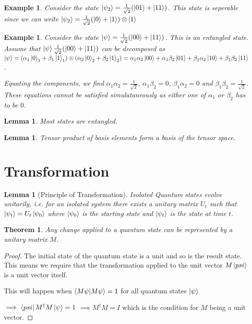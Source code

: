 \documentclass[12pt,twoside]{report}
\theoremstyle{thmstyle}
\newtheorem{thm}[subsection]{Theorem}
\newtheorem{eg}[subsection]{Example}
\newtheorem{lemma}[subsection]{Lemma}
\begin{document}
\begin{eg}
Consider the state $\ket{\psi_2} = \frac{1}{\sqrt{2}} (\ket{01} + \ket{11})$. This state is seperable since we can write $\ket{\psi_2} = \frac{1}{\sqrt{2}} (\ket{0} + \ket{1}) \otimes \ket{1}$
\end{eg}


\begin{eg}
Consider the state $\ket{\psi} = \frac{1}{\sqrt{2}} (\ket{00} + \ket{11})$. This is an entangled state.
    \vspace{0.5cm}
    Assume that  $\ket{\psi} \frac{1}{\sqrt{2}} (\ket{00} + \ket{11}) $ can be decomposed as $\ket{\psi} = (\alpha_1 \ket{0}_1 + \beta_1 \ket{1}_1) \otimes (\alpha_2 \ket{0}_2 + \beta_2 \ket{1}_2) = \alpha_1 \alpha_2 \ket{00} + \alpha_1 \beta_2 \ket{01} + \beta_1 \alpha_2 \ket{10} + \beta_1 \beta_2 \ket{11}$.

    \vspace{0.5cm}

    Equating the components, we find $\alpha_1 \alpha_2 = \frac{1}{\sqrt{2}}$, $\alpha_1 \beta_2 = 0$, $\beta_1 \alpha_2 = 0$ and $\beta_1 \beta_2 = \frac{1}{\sqrt{2}}$. These equations cannot be satisfied simulataneously as either one of $\alpha_1$ or $\beta_2$ has to be $0$.
\end{eg}

\begin{lemma}
    Most states are entangled.
\end{lemma}

\begin{lemma}
    Tensor product of basis elements form a basis of the tensor space.
\end{lemma}

\section{Transformation}

\begin{lemma}[Principle of Transformation]
    Isolated Quantum states evolve unitarily, i.e. for an isolated system there exists a unitary matrix $U_t$ such that $\ket{\psi_t} = U_t \ket{\psi_0}$ where $\ket{\psi_0}$ is the starting state and $\ket{\psi_t}$ is the state at time $t$.
\end{lemma}

\begin{thm}
    Any change applied to a quantum state can be represented by a unitary matrix $M$.
\end{thm}
\begin{proof}
    The initial state of the quantum state is a unit and so is the result state. This means we require that the transformation applied to the unit vector $M \ket{psi}$ is a unit vector itself.

    This will happen when $\braket{M \psi | M\psi} = 1$ for all quantum states $\ket{\psi}$

    $\implies \bra{psi} M^\dagger M \ket{\psi} = 1$
    $\implies M^\dagger M = I$ which is the condition for $M$ being a unit vector.
\end{proof}
\end{document}
